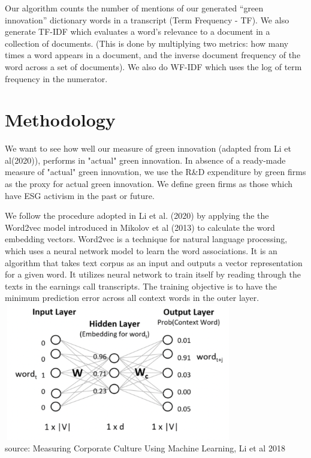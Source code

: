 \documentclass[10pt]{article}
\begin{document}
Our algorithm counts the number of mentions of our generated “green innovation” dictionary words in a transcript (Term Frequency - TF). We also generate TF-IDF which evaluates a word's relevance to a document in a collection of documents. (This is done by multiplying two metrics: how many times a word appears in a document, and the inverse document frequency of the word across a set of documents). We also do WF-IDF which uses the log of term frequency in the numerator.


\section{Methodology}

We want to see how well our measure of green innovation (adapted from Li et al(2020)), performs in "actual" green innovation. In absence of a ready-made measure of "actual" green innovation, we use the R\&D expenditure by green firms as the proxy for actual green innovation. We define green firms as those which have ESG activism in the past or future.


We follow the procedure adopted in Li et al. (2020) by applying the the Word2vec model introduced in Mikolov et al (2013) to calculate the word embedding vectors. Word2vec is a technique for natural language processing, which uses a neural network model to learn the word associations. It is an algorithm that takes text corpus as an input and outputs a vector representation for a given word. It utilizes neural network to train itself by reading through the texts in the earnings call transcripts. The training objective is to have the minimum prediction error across all context words in the outer layer. 
\\



\includegraphics[height=6cm, width=10cm]{word2vec.png}\\
{\footnotesize source: Measuring Corporate Culture Using Machine Learning, Li et al 2018 }
\end{document}
